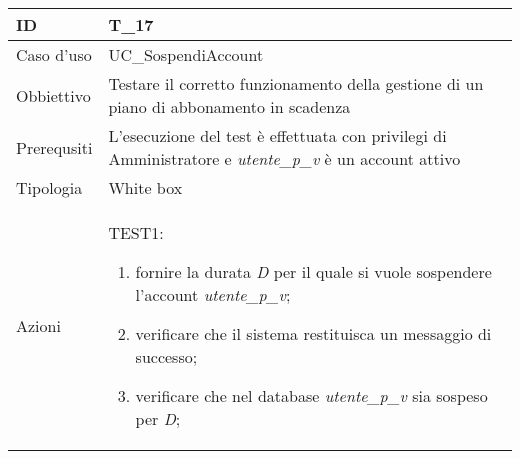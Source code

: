 \begin{table}[hb]
    \centering
    \begin{tabular}{ |p{2cm}|p{10cm}|  }
        \hline
        ID          & T\_17                                                                                                         \\\hline
        Caso d'uso  & UC\_SospendiAccount                                                                                           \\\hline
        Obbiettivo  & Testare il corretto funzionamento della gestione di un piano di abbonamento in scadenza                       \\\hline
        Prerequsiti & L'esecuzione del test è effettuata con privilegi di Amministratore e  \emph{utente\_p\_v} è un account attivo \\\hline
        Tipologia   & White box                                                                                                     \\\hline
        Azioni      &
        TEST1:
        \begin{enumerate}[nosep, topsep=0pt]
            \item fornire la durata \emph{D} per il quale si vuole sospendere l'account \emph{utente\_p\_v};
            \item verificare che il sistema restituisca un messaggio di successo;
            \item verificare che nel database \emph{utente\_p\_v} sia sospeso per \emph{D};
        \end{enumerate}

        \\\hline
    \end{tabular}
\end{table}

